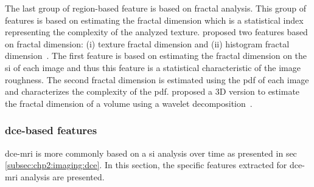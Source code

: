 \begin{enumerate}[leftmargin=*]
The last group of region-based feature is based on fractal analysis.
This group of features is based on estimating the fractal dimension which is a
statistical index representing the complexity of the analyzed texture.
\citeauthor{Lv2009} proposed two features based on fractal dimension: (i)
texture fractal dimension and (ii) histogram fractal dimension~\cite{Lv2009}.
The first feature is based on estimating the fractal dimension on the \ac{si}
of each image and thus this feature is a statistical characteristic of the
image roughness.
The second fractal dimension is estimated using the \ac{pdf} of each image and
characterizes the complexity of the \ac{pdf}.
\citeauthor{Lopes2011} proposed a 3D version to estimate the fractal dimension
of a volume using a wavelet decomposition~\cite{Lopes2011}.

\end{enumerate}

\subsubsection{\acs*{dce}-based features}\label{subsubsec:chp3:img-clas:CADX-fea-dec:DCE-fea}

\ac{dce}-\ac{mri} is more commonly based on a \ac{si} analysis over time as
presented in \acs{sec}\,\ref{subsec:chp2:imaging:dce}.
In this section, the specific features extracted for \ac{dce}-\ac{mri} analysis
are presented.

